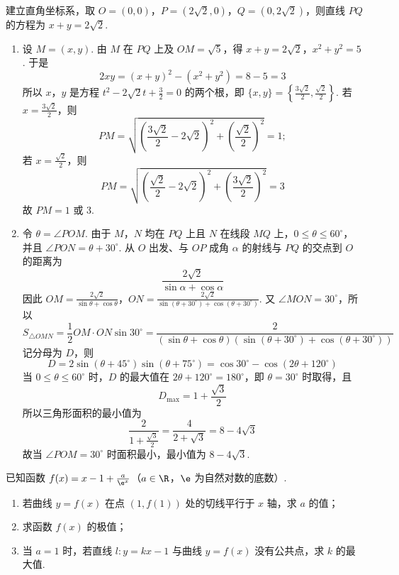 \begin{solution}
建立直角坐标系，取 \(O=(0,0)\)，\(P=(2\sqrt2,0)\)，\(Q=(0,2\sqrt2)\)，则直线 \(PQ\) 的方程为 \(x+y=2\sqrt2\).

\begin{enumerate}
\item 设 \(M=(x,y)\). 由 \(M\) 在 \(PQ\) 上及 \(OM=\sqrt5\)，得
\(x+y=2\sqrt2\)，\(x^2+y^2=5\).
于是
\[
2xy=(x+y)^2-(x^2+y^2)=8-5=3
\]
所以 \(x\)，\(y\) 是方程 \(t^2-2\sqrt2t+\frac32=0\) 的两个根，即 \(\{x,y\}=\left\{\frac{3\sqrt2}{2},\frac{\sqrt2}{2}\right\}\). 若 \(x=\frac{3\sqrt2}{2}\)，则
\[
PM=\sqrt{\left(\frac{3\sqrt2}{2}-2\sqrt2\right)^2+\left(\frac{\sqrt2}{2}\right)^2}=1;
\]
若 \(x=\frac{\sqrt2}{2}\)，则
\[
PM=\sqrt{\left(\frac{\sqrt2}{2}-2\sqrt2\right)^2+\left(\frac{3\sqrt2}{2}\right)^2}=3
\]
故 \(PM=1\) 或 \(3\).

\item 令 \(\theta=\angle POM\). 由于 \(M\)，\(N\) 均在 \(PQ\) 上且 \(N\) 在线段 \(MQ\) 上，\(0\leqslant\theta\leqslant60^\circ\)，并且 \(\angle PON=\theta+30^\circ\). 从 \(O\) 出发、与 \(OP\) 成角 \(\alpha\) 的射线与 \(PQ\) 的交点到 \(O\) 的距离为
\[
\frac{2\sqrt2}{\sin\alpha+\cos\alpha}
\]
因此
\(OM=\frac{2\sqrt2}{\sin\theta+\cos\theta}\)，\(ON=\frac{2\sqrt2}{\sin(\theta+30^\circ)+\cos(\theta+30^\circ)}\).
又 \(\angle MON=30^\circ\)，所以
\[
S_{\triangle OMN}=\frac12OM\cdot ON\sin30^\circ
=\frac{2}{(\sin\theta+\cos\theta)(\sin(\theta+30^\circ)+\cos(\theta+30^\circ))}
\]
记分母为 \(D\)，则
\[
D=2\sin(\theta+45^\circ)\sin(\theta+75^\circ)
=\cos30^\circ-\cos(2\theta+120^\circ)
\]
当 \(0\leqslant\theta\leqslant60^\circ\) 时，\(D\) 的最大值在 \(2\theta+120^\circ=180^\circ\)，即 \(\theta=30^\circ\) 时取得，且
\[
D_{\max}=1+\frac{\sqrt3}{2}
\]
所以三角形面积的最小值为
\[
\frac{2}{1+\frac{\sqrt3}{2}}=\frac{4}{2+\sqrt3}=8-4\sqrt3
\]
故当 \(\angle POM=30^\circ\) 时面积最小，最小值为 \(8-4\sqrt3\).
\end{enumerate}
\end{solution}

\begin{problem}
已知函数 \( f(x) = x - 1 + \frac{a}{\e^{x}} \)（\(a \in \R\)，\(\e\) 为自然对数的底数）.
\begin{enumerate}
\item 若曲线 \( y = f(x) \) 在点 \( (1, f(1)) \) 处的切线平行于 \( x \) 轴，求 \(a\) 的值；
\item 求函数 \( f(x) \) 的极值；
\item 当 \(a = 1\) 时，若直线 \(l: y = kx - 1\) 与曲线 \(y = f(x) \) 没有公共点，求 \(k\) 的最大值.
\end{enumerate}
\end{problem}

